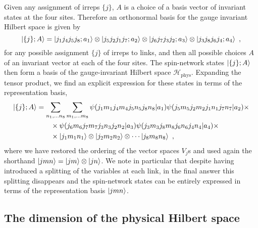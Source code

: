 Given any assignment of irreps $\{j\}$, $A$ is a choice of a basis vector of invariant states at the four sites.
Therefore an orthonormal basis for the gauge invariant Hilbert space is given by
\begin{equation}
    \ket{ \{j\};A} = \ket{j_1 j_4 j_5 j_8 ; a_1} \otimes \ket{j_5 j_2 j_1 j_7 ; a_2} \otimes \ket{j_6 j_7 j_3 j_2 ; a_3} \otimes \ket{j_3 j_8 j_6 j_4 ; a_4} \ ,
\end{equation}
for any possible assignment $\{j\}$ of irreps to links, and then all possible choices $A$ of an invariant vector at each of the four sites. The spin-network states $\ket{ \{j\};A}$ then form a basis of the gauge-invariant Hilbert space $\mathcal{H}_{\mathrm{phys}}$.
Expanding the tensor product, we find an explicit expression for these states in terms of the representation basis,
\begin{align}
    \label{eq:spin network states 2x2}
    \ket{ \{j\};A} &= \sum_{n_1, \ldots n_8} \sum_{m_1, \ldots m_8} \psi\pqty{j_1 m_1 j_4 m_4 j_5 n_5 j_8 n_8 | a_1} \psi\pqty{j_5 m_5 j_2 m_2 j_1 n_1 j_7 n_7 | a_2} \times \nonumber \\
    &\quad \quad \times \psi\pqty{j_6 m_6 j_7 m_7 j_3 n_3 j_2 n_2 | a_3} \psi\pqty{j_3 m_3 j_8 m_8 j_6 n_6 j_4 n_4 | a_4} \times \\
    &\quad \quad \times \ket{j_1 m_1 n_1} \otimes \ket{j_2 m_2 n_2} \otimes \cdots \ket{j_8 m_8 n_8} \nonumber \ ,
\end{align}
where we have restored the ordering of the vector spaces $V_j$s and used again the shorthand $\ket{jmn}=\ket{jm}\otimes \ket{jn}$. We note in particular that despite having introduced a splitting of the variables at each link, in the final answer this splitting disappears and the spin-network states can be  entirely expressed in terms of the representation basis $\ket{jmn}$.

\subsection{The dimension of the physical Hilbert space}\label{sec:spin networks dimension}

